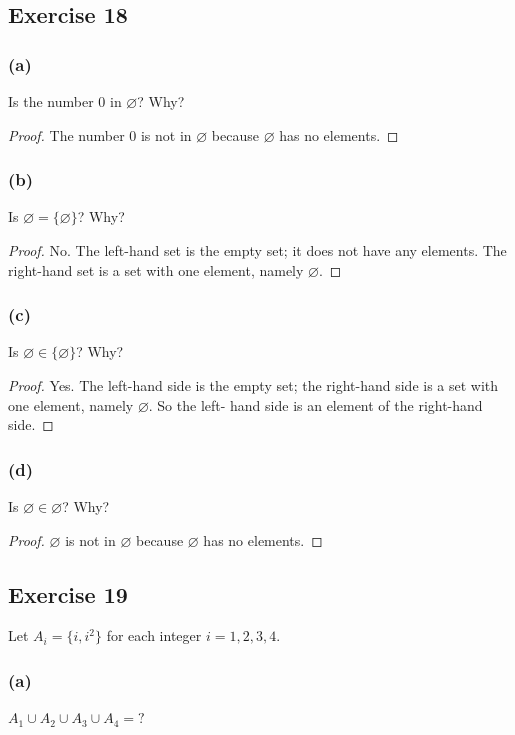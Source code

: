 \documentclass[14pt]{extarticle}
\newcommand{\es}{\varnothing}
\begin{document}
\subsection{Exercise 18}

\subsubsection{(a)}
Is the number 0 in $\es$? Why?

\begin{proof}
The number 0 is not in $\es$ because $\es$ has no elements.
\end{proof}

\subsubsection{(b)}
Is $\es = \{\es\}$? Why?

\begin{proof}
No. The left-hand set is the empty set; it does not have any elements. The right-hand set is a set with one element, namely $\es$.
\end{proof}

\subsubsection{(c)}
Is $\es \in \{\es\}$? Why?

\begin{proof}
Yes. The left-hand side is the empty set; the right-hand side is a set with one element, namely $\es$. So the left-
hand side is an element of the right-hand side.
\end{proof}

\subsubsection{(d)}
Is $\es \in \es$? Why?

\begin{proof}
$\es$ is not in $\es$ because $\es$ has no elements.
\end{proof}

\subsection{Exercise 19}
Let \(A_i = \{i, i^2\}\) for each integer \(i = 1, 2, 3, 4\).

\subsubsection{(a)}
\(A_1 \cup A_2 \cup A_3 \cup A_4 = ?\)
\end{document}
